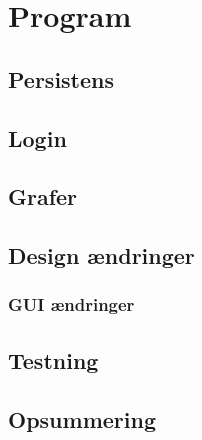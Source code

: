 \chapter{Program}

\section{Persistens}

\section{Login}

\section{Grafer}

\section{Design ændringer}

\subsection{GUI ændringer}

\section{Testning}

\section{Opsummering}
